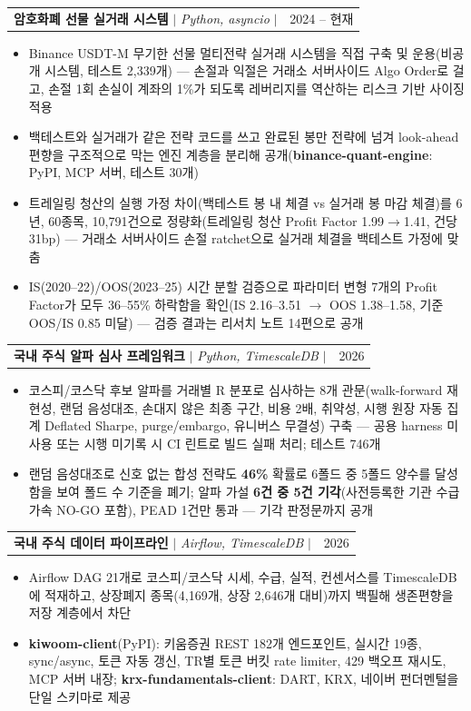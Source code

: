 \documentclass[a4paper,11pt]{article}
\makeatletter
\newcommand{\resumeItem}[1]{\item\small{{#1 \vspace{-2pt}}}}
\newcommand{\resumeProjectHeading}[2]{
    \item
    \begin{tabular*}{0.97\textwidth}{l@{\extracolsep{\fill}}r}
      \small#1 & #2 \\
    \end{tabular*}\vspace{-7pt}
}
\newcommand{\resumeItemListStart}{\begin{itemize}[itemsep=0pt]}
\newcommand{\resumeItemListEnd}{\end{itemize}\vspace{-5pt}}
\makeatother
\begin{document}
    \resumeProjectHeading
        {\textbf{암호화폐 선물 실거래 시스템} $|$ \emph{Python, asyncio} $|$ \normalfont{\href{https://github.com/younghwan91/binance-quant-engine}{\underline{엔진 (공개)}}, \href{https://github.com/younghwan91/crypto-quant-insights}{\underline{리서치 노트}}}}{2024 -- 현재}
        \resumeItemListStart
          \resumeItem{Binance USDT-M 무기한 선물 멀티전략 실거래 시스템을 직접 구축 및 운용(비공개 시스템, 테스트 2,339개) --- 손절과 익절은 거래소 서버사이드 Algo Order로 걸고, 손절 1회 손실이 계좌의 1\%가 되도록 레버리지를 역산하는 리스크 기반 사이징 적용}
          \resumeItem{백테스트와 실거래가 같은 전략 코드를 쓰고 완료된 봉만 전략에 넘겨 look-ahead 편향을 구조적으로 막는 엔진 계층을 분리해 공개(\textbf{binance-quant-engine}: PyPI, MCP 서버, 테스트 30개)}
          \resumeItem{트레일링 청산의 실행 가정 차이(백테스트 봉 내 체결 vs 실거래 봉 마감 체결)를 6년, 60종목, 10,791건으로 정량화(트레일링 청산 Profit Factor 1.99$\to$1.41, 건당 31bp) --- 거래소 서버사이드 손절 ratchet으로 실거래 체결을 백테스트 가정에 맞춤}
          \resumeItem{IS(2020--22)/OOS(2023--25) 시간 분할 검증으로 파라미터 변형 7개의 Profit Factor가 모두 36--55\% 하락함을 확인(IS 2.16--3.51 $\to$ OOS 1.38--1.58, 기준 OOS/IS 0.85 미달) --- 검증 결과는 리서치 노트 14편으로 공개}
        \resumeItemListEnd

    \resumeProjectHeading
        {\textbf{국내 주식 알파 심사 프레임워크} $|$ \emph{Python, TimescaleDB} $|$ \normalfont{\href{https://github.com/younghwan91/swing-it}{\underline{github}}}}{2026}
        \resumeItemListStart
          \resumeItem{코스피/코스닥 후보 알파를 거래별 R 분포로 심사하는 8개 관문(walk-forward 재현성, 랜덤 음성대조, 손대지 않은 최종 구간, 비용 2배, 취약성, 시행 원장 자동 집계 Deflated Sharpe, purge/embargo, 유니버스 무결성) 구축 --- 공용 harness 미사용 또는 시행 미기록 시 CI 린트로 빌드 실패 처리; 테스트 746개}
          \resumeItem{랜덤 음성대조로 신호 없는 합성 전략도 \textbf{46\%} 확률로 6폴드 중 5폴드 양수를 달성함을 보여 폴드 수 기준을 폐기; 알파 가설 \textbf{6건 중 5건 기각}(사전등록한 기관 수급 가속 NO-GO 포함), PEAD 1건만 통과 --- 기각 판정문까지 공개}
        \resumeItemListEnd

    \resumeProjectHeading
        {\textbf{국내 주식 데이터 파이프라인} $|$ \emph{Airflow, TimescaleDB} $|$ \normalfont{\href{https://github.com/younghwan91/quant-airflow}{\underline{quant-airflow}}, \href{https://github.com/younghwan91/kiwoom-client}{\underline{kiwoom-client}}, \href{https://github.com/younghwan91/krx-fundamentals-client}{\underline{krx-fundamentals}}}}{2026}
        \resumeItemListStart
          \resumeItem{Airflow DAG 21개로 코스피/코스닥 시세, 수급, 실적, 컨센서스를 TimescaleDB에 적재하고, 상장폐지 종목(4,169개, 상장 2,646개 대비)까지 백필해 생존편향을 저장 계층에서 차단}
          \resumeItem{\textbf{kiwoom-client}(PyPI): 키움증권 REST 182개 엔드포인트, 실시간 19종, sync/async, 토큰 자동 갱신, TR별 토큰 버킷 rate limiter, 429 백오프 재시도, MCP 서버 내장; \textbf{krx-fundamentals-client}: DART, KRX, 네이버 펀더멘털을 단일 스키마로 제공}
        \resumeItemListEnd
\end{document}
